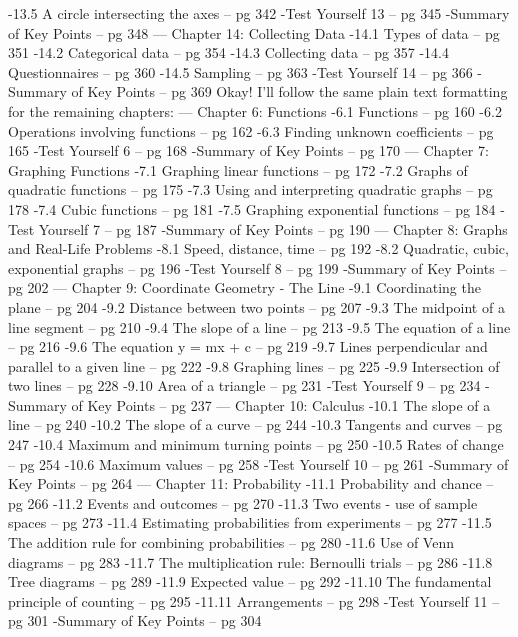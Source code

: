 -13.5 A circle intersecting the axes – pg 342  
-Test Yourself 13 – pg 345  
-Summary of Key Points – pg 348
---
Chapter 14: Collecting Data  
-14.1 Types of data – pg 351  
-14.2 Categorical data – pg 354  
-14.3 Collecting data – pg 357  
-14.4 Questionnaires – pg 360  
-14.5 Sampling – pg 363  
-Test Yourself 14 – pg 366  
-Summary of Key Points – pg 369
Okay! I'll follow the same plain text formatting for the remaining chapters:
---
 Chapter 6: Functions  
-6.1 Functions – pg 160  
-6.2 Operations involving functions – pg 162  
-6.3 Finding unknown coefficients – pg 165  
-Test Yourself 6 – pg 168  
-Summary of Key Points – pg 170  
---
 Chapter 7: Graphing Functions  
-7.1 Graphing linear functions – pg 172  
-7.2 Graphs of quadratic functions – pg 175  
-7.3 Using and interpreting quadratic graphs – pg 178  
-7.4 Cubic functions – pg 181  
-7.5 Graphing exponential functions – pg 184  
-Test Yourself 7 – pg 187  
-Summary of Key Points – pg 190  
---
 Chapter 8: Graphs and Real-Life Problems  
-8.1 Speed, distance, time – pg 192  
-8.2 Quadratic, cubic, exponential graphs – pg 196  
-Test Yourself 8 – pg 199  
-Summary of Key Points – pg 202  
---
 Chapter 9: Coordinate Geometry - The Line  
-9.1 Coordinating the plane – pg 204  
-9.2 Distance between two points – pg 207  
-9.3 The midpoint of a line segment – pg 210  
-9.4 The slope of a line – pg 213  
-9.5 The equation of a line – pg 216  
-9.6 The equation y = mx + c – pg 219  
-9.7 Lines perpendicular and parallel to a given line – pg 222  
-9.8 Graphing lines – pg 225  
-9.9 Intersection of two lines – pg 228  
-9.10 Area of a triangle – pg 231  
-Test Yourself 9 – pg 234  
-Summary of Key Points – pg 237  
---
 Chapter 10: Calculus  
-10.1 The slope of a line – pg 240  
-10.2 The slope of a curve – pg 244  
-10.3 Tangents and curves – pg 247  
-10.4 Maximum and minimum turning points – pg 250  
-10.5 Rates of change – pg 254  
-10.6 Maximum values – pg 258  
-Test Yourself 10 – pg 261  
-Summary of Key Points – pg 264  
---
 Chapter 11: Probability  
-11.1 Probability and chance – pg 266  
-11.2 Events and outcomes – pg 270  
-11.3 Two events - use of sample spaces – pg 273  
-11.4 Estimating probabilities from experiments – pg 277  
-11.5 The addition rule for combining probabilities – pg 280  
-11.6 Use of Venn diagrams – pg 283  
-11.7 The multiplication rule: Bernoulli trials – pg 286  
-11.8 Tree diagrams – pg 289  
-11.9 Expected value – pg 292  
-11.10 The fundamental principle of counting – pg 295  
-11.11 Arrangements – pg 298  
-Test Yourself 11 – pg 301  
-Summary of Key Points – pg 304  
